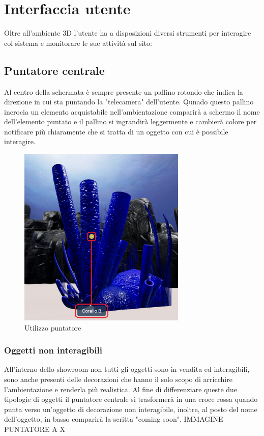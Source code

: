 \section{Interfaccia utente}
Oltre all'ambiente 3D l'utente ha a disposizioni diversi strumenti per interagire col sistema e monitorare le sue attività sul sito:
\subsection{Puntatore centrale}
Al centro della schermata è sempre presente un pallino rotondo che indica la direzione in cui sta puntando la "telecamera" dell'utente. Qunado questo pallino incrocia un elemento acquistabile nell'ambientazione comparirà a schermo il nome dell'elemento puntato e il pallino si ingrandirà leggermente e cambierà colore per notificare più chiaramente che si tratta di un oggetto con cui è possibile interagire.
\begin{figure}
  \renewcommand{\thefigure}{3}
\begin{center}
  \includegraphics[width=8cm]{./res/images/puntatore.png}
 \end{center}
 \caption{Utilizzo puntatore}
  \label{Utilizzo puntatore}
\end{figure}

\subsubsection{Oggetti non interagibili}
All'interno dello showroom non tutti gli oggetti sono in vendita ed interagibili, sono anche presenti delle decorazioni che hanno il solo scopo di arricchire l'ambientazione e renderla più realistica.
Al fine di differenziare queste due tipologie di oggetti il puntatore centrale si trasformerà in una croce rossa quando punta verso un'oggetto di decorazione non interagibile, inoltre, al posto del nome dell'oggetto, in basso comparirà la scritta "coming soon".
IMMAGINE PUNTATORE A X

